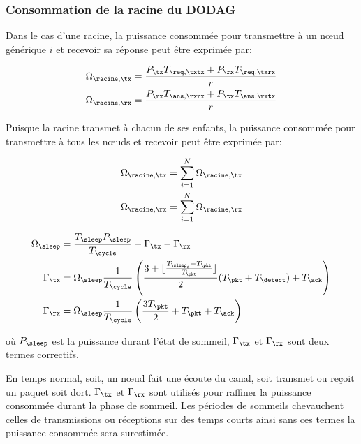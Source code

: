 
\subsubsection{Consommation de la racine du \ac{DODAG}}

Dans le cas d'une racine, la puissance consommée pour transmettre à un nœud générique $i$ et recevoir sa réponse peut être exprimée par:

\begin{align}
  \Omega_{\racine, \tx} &= \frac{P_\tx T_{\req, \txtx} + P_\rx T_{\req, \txrx}}{r} 
  \label{contikimac:eq:racine_tx} \\
  \Omega_{\racine, \rx} &= \frac{P_\rx T_{\ans, \rxrx} + P_\tx T_{\ans, \rxtx}}{r} 
  \label{contikimac:eq:racine_rx}
\end{align}

Puisque la racine transmet à chacun de ses enfants, la puissance consommée pour transmettre à tous les nœuds et recevoir peut être exprimée par:

\begin{align}
  \Omega_{\racine, \tx } &= \sum_{i=1}^{N}\Omega_{\racine, \tx } 
    \label{contikimac:eq:root_tx} \\
    \Omega_{\racine, \rx } &= \sum_{i=1}^{N}\Omega_{\racine, \rx } 
    \label{contikimac:eq:root_rx}
\end{align}


\begin{align}
  \Omega_\sleep  &= \dfrac{T_\sleep P_\sleep}{T_\cycle} - \Gamma_\tx - \Gamma_\rx
  \label{contikimac:eq:omega_sleep} \\
  \Gamma_\tx &= \Omega_\sleep
  \frac{1}{T_\cycle}
  \left( \dfrac{3+\lfloor\frac{T_{\sleep_i}-T_\pkt}{T_\pkt}\rfloor}{2}(T_\pkt + T_\detect) + T_\ack \right)
  \label{contikimac:eq:gamma_tx}  \\
  \Gamma_\rx &= \Omega_\sleep
  \frac{1}{T_\cycle}
    \left( \frac{3 T_\pkt}{2} + T_\pkt + T_\ack \right)
    \label{contikimac:eq:gamma_rx}
\end{align}

où $P_\sleep$ est la puissance durant l'état de sommeil, $\Gamma_\tx$ et $\Gamma_\rx$ sont deux termes correctifs.

En temps normal, soit, un nœud fait une écoute du canal, soit transmet ou reçoit un paquet soit dort.
$\Gamma_\tx$ et $\Gamma_\rx$ sont utilisés pour raffiner la puissance consommée durant la phase de sommeil.
Les périodes de sommeils chevauchent celles de transmissions ou réceptions sur des temps courts ainsi sans ces termes la puissance consommée sera surestimée.

